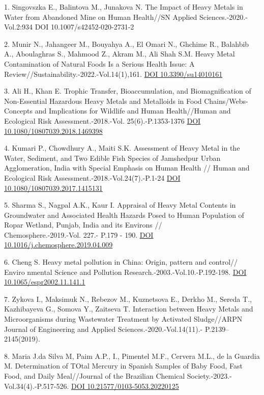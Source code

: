 \begin{references}
1. Singovszka E., Balintova M., Junakova N. The Impact of Heavy
Metals in Water from Abandoned Mine on Human Health//SN Applied
Sciences.-2020.-Vol.2:934 DOI 10.1007/s42452-020-2731-2

2. Munir N., Jahangeer M., Bouyahya A., El Omari N., Ghchime R.,
Balahbib A., Aboulaghras S., Mahmood Z., Akram M., Ali Shah S.M.
Heavy Metal Contamination of Natural Foods Is a Serious Health
Issue: A Review//Sustainability.-2022.-Vol.14(1),161.
\href{https://doi.org/10.3390/su14010161}{DOI 10.3390/su14010161}

3. Ali H., Khan E. Trophic Transfer, Bioaccumulation, and
Biomagnification of Non-Essential Hazardous Heavy Metals and
Metalloids in Food Chains/Webs-Concepts and Implications for
Wildlife and Human Health//Human and Ecological Risk
Assessment.-2018.-Vol. 25(6).-P.1353-1376
\href{https://doi.org/10.1080/10807039.2018.1469398}{DOI\\
10.1080/10807039.2018.1469398}

4. Kumari P., Chowdhury A., Maiti S.K. Assessment of Heavy Metal
in the Water, Sediment, and Two Edible Fish Species of
Jamshedpur Urban Agglomeration, India with Special Emphasis on
Human Health // Human and Ecological Risk
Assessment.-2018.-Vol.24(7).-P.1-24
\href{https://doi.org/10.1080/10807039.2017.1415131}{DOI\\
10.1080/10807039.2017.1415131}

5. Sharma S., Nagpal A.K., Kaur I. Appraisal of Heavy Metal
Contents in Groundwater and Associated Health Hazards Posed to
Human Population of Ropar Wetland, Punjab, India and its
Environs // \\Chemosphere.-2019.-Vol. 227.- P.179 - 190.
\href{https://doi.org/10.1016/j.chemosphere.2019.04.009}{DOI
10.1016/j.chemosphere.2019.04.009}

6. Cheng S. Heavy metal pollution in China: Origin, pattern and
control// Enviro nmental Science
and Pollution Research.-2003.-Vol.10.-P.192-198.
\href{https://doi.org/10.1065/espr2002.11.141.1}{DOI
10.1065/espr2002.11.141.1}

7. Zykova I., Maksimuk N., Rebezov M., Kuznetsova E., Derkho M.,
Sereda T., Kazhibayeva G., Somova Y., Zaitseva T. Interaction
between Heavy Metals and Microorganisms during Wastewater
Treatment by Activated Sludge//ARPN Journal of Engineering and
Applied Sciences.-2020.-Vol.14(11).- P.2139--2145(2019).

8. Maria J.da Silva M, Paim A.P., I., Pimentel M.F., Cervera M.L.,
de la Guardia M. Determination of TOtal Mercury in Spanish Samples
of Baby Food, Fast Food, and Daily Meal//Journal of the
Brazilian Chemical Society.-2023.-Vol.34(4).-P.517-526.
\href{http://dx.doi.org/10.21577/0103-5053.20220125}{DOI
10.21577/0103-5053.20220125}


\end{references}
